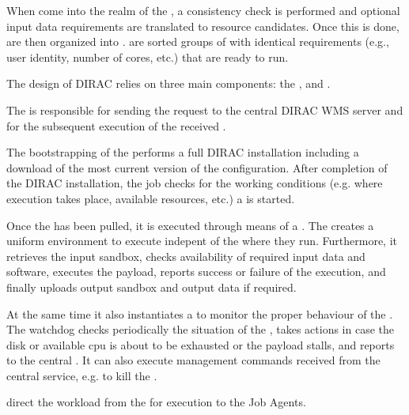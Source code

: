 \documentclass{sig-alternate}
\begin{document}
When  come into the realm of the , a consistency
check is performed and optional input data requirements are translated to
resource candidates.
Once this is done,  are then organized into .
 are sorted groups of  with identical
requirements (e.g., user identity, number of cores, etc.) that are ready to run.

The design of DIRAC relies on three main components: the 
, and .

The  is responsible for sending the 
request to the central DIRAC WMS server and for the subsequent execution of the
received .

The bootstrapping of the  performs a full DIRAC
installation including a download of the most current version of the
configuration.
After completion of the DIRAC installation, the job checks for the working
conditions (e.g. where execution takes place, available resources, etc.) a
 is started.

Once the  has been pulled, it is executed through means of a
.
The  creates a uniform environment to execute
 indepent of the  where they run.
Furthermore, it retrieves the input sandbox, checks availability of required
input data and software, executes the payload, reports success or failure of
the execution, and finally uploads output sandbox and output data if required.

At the same time it also instantiates a  to monitor the
proper behaviour of the .
The watchdog checks periodically the situation of the ,
takes actions in case the disk or available cpu is about to be exhausted or the
payload stalls, and reports to the central .
It can also execute management commands received from the central service, e.g.
to kill the .

 


 direct the workload from the 
for execution to the Job Agents.
\end{document}
